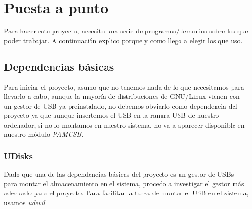 \documentclass[titlepage]{article}
\begin{document}
\section{Puesta a punto}
Para hacer este proyecto, necesito una serie de programas/demonios sobre los que poder trabajar. A continuación explico porque y como llego a elegir los que uso. 
\subsection{Dependencias básicas}
Para iniciar el proyecto, asumo que no tenemos nada de lo que necesitamos para llevarlo a cabo, aunque la mayoría de distribuciones de \Gls{GNU/Linux} vienen con un gestor de USB ya preinstalado, no debemos obviarlo como dependencia del proyecto ya que aunque insertemos el USB en la ranura USB de nuestro ordenador, si no lo montamos en nuestro sistema, no va a aparecer disponible en nuestro módulo \textit{\Gls{PAMUSB}}.
\subsubsection{UDisks}
Dado que una de las dependencias básicas del proyecto es un gestor de USBs para montar el almacenamiento en el sistema, procedo a investigar el gestor más adecuado para el proyecto. Para facilitar la tarea de montar el USB en el sistema, usamos \textit{\Gls{udevil}} \cite{udevil}
\clearpage
\printglossaries
\clearpage
\printbibliography[heading=bibintoc,title={Bibliografía}]
\end{document}
